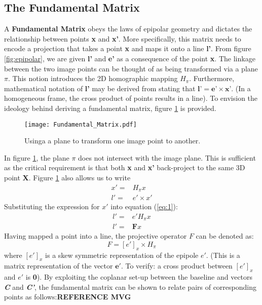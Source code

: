\documentclass[12pt]{article}
\begin{document}
\subsection{The Fundamental Matrix}
A \textbf{Fundamental Matrix} obeys the laws of epipolar geometry and dictates the relationship between points \textbf{x} and \textbf{x'}. More specifically, this matrix needs to encode a projection that takes a point \textbf{x} and maps it onto a line \textbf{l'}. From figure \ref{fig:epipolar}, we are given \textbf{l'} and \textbf{e'} as a consequence of the point \textbf{x}. The linkage between the two image points can be thought of as being transformed via a plane $\pi$. This notion introduces the 2D homographic mapping $H_{\pi}$. Furthermore, mathematical notation of \textbf{l'} may be derived from stating that $ \textbf{l'} = \textbf{e'} \times \textbf{x'}$. (In a homogeneous frame, the cross product of points results in a line). To envision the ideology behind deriving a fundamental matrix, figure \ref{fig:fundamental} is provided.
\begin{figure}
\centering
\texttt{[image: Fundamental\_Matrix.pdf]}
\caption{Usinga a plane to transform one image point to another.}\label{fig:fundamental}
\end{figure}
\FloatBarrier
In figure \ref{fig:fundamental}, the plane $\pi$ does not intersect with the image plane. This is sufficient as the critical requirement is that both \textbf{x} and \textbf{x'} back-project to the same 3D point \textbf{X}. Figure \ref{fig:fundamental} also allows us to write
\begin{align}
x'={} & H_{\pi}x\\
l'={}&e' \times x' \label{eq:1}
\end{align}
Substituting the expression for $x'$ into equation (\ref{eq:1}):
\begin{align*}
l' = {}& e'H_{\pi}x\\
l' ={}& \textbf{F}x
\end{align*}
Having mapped a point into a line, the projective operator $F$ can be denoted as:
\begin{equation}\label{eq:2}
F = \left[e'\right]_x \times H_{\pi} 
\end{equation}
where $\left[e'\right]_x $ is a skew symmetric representation of the epipole $e'$. (This is a matrix representation of the vector $\mathbf{e'}$. To verify: a cross product between $\left[e'\right]_x$ and $e'$ is \textbf{0}).  
By exploiting the coplanar set-up between the  baseline and vectors \textbf{\textit{C}} and \textbf{\textit{C'}}, the fundamental matrix can be shown to relate pairs of corresponding points as follows:\textbf{REFERENCE MVG}
\end{document}
